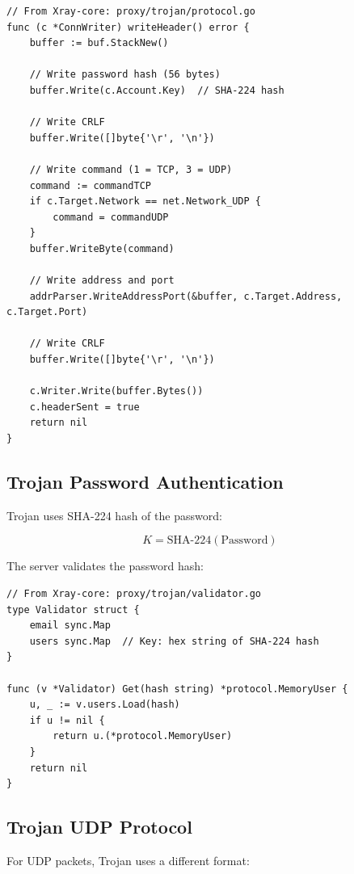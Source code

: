\begin{verbatim}
// From Xray-core: proxy/trojan/protocol.go
func (c *ConnWriter) writeHeader() error {
    buffer := buf.StackNew()
    
    // Write password hash (56 bytes)
    buffer.Write(c.Account.Key)  // SHA-224 hash
    
    // Write CRLF
    buffer.Write([]byte{'\r', '\n'})
    
    // Write command (1 = TCP, 3 = UDP)
    command := commandTCP
    if c.Target.Network == net.Network_UDP {
        command = commandUDP
    }
    buffer.WriteByte(command)
    
    // Write address and port
    addrParser.WriteAddressPort(&buffer, c.Target.Address, c.Target.Port)
    
    // Write CRLF
    buffer.Write([]byte{'\r', '\n'})
    
    c.Writer.Write(buffer.Bytes())
    c.headerSent = true
    return nil
}
\end{verbatim}

\subsection{Trojan Password Authentication}

Trojan uses SHA-224 hash of the password:

\[
K = \text{SHA-224}(\text{Password})
\]

The server validates the password hash:

\begin{verbatim}
// From Xray-core: proxy/trojan/validator.go
type Validator struct {
    email sync.Map
    users sync.Map  // Key: hex string of SHA-224 hash
}

func (v *Validator) Get(hash string) *protocol.MemoryUser {
    u, _ := v.users.Load(hash)
    if u != nil {
        return u.(*protocol.MemoryUser)
    }
    return nil
}
\end{verbatim}

\subsection{Trojan UDP Protocol}

For UDP packets, Trojan uses a different format:

